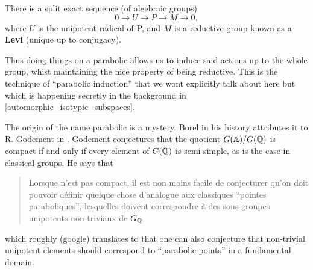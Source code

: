 \begin{Lemma}
    There is a split exact sequence (of algebraic groups)
    \[0 \to U \to P \to M \to 0,\]
    where \(U\) is the unipotent radical of P, and \(M\) is a reductive group known as a \textbf{Levi} (unique up to conjugacy).
\end{Lemma}

Thus doing things on a parabolic allows us to induce said actions up to the whole group, whist maintaining the nice property of being reductive. This is the technique of ``parabolic induction'' \cite[Thm. 10]{bernsteinREPRESENTATIONSPADICGROUPS1992} that we wont explicitly talk about here but which is happening secretly in the background in \ref{automorphic_isotypic_subspaces}.

\begin{Remark}
    The origin of the name parabolic is a mystery. Borel in his history \cite[VI.\S 2]{EssaysHistoryLie} attributes it to R. Godement in \cite{godementGroupesLineairesAlgebriques}. Godement conjectures that the quotient \(G(\A) / G(\Q)\) is compact if and only if every element of \(G(\Q)\) is semi-simple, as is the case in classical groups.  He says that 
    \begin{quote}
        Lorsque n'est pas compact, il est non moins facile de conjecturer qu’on doit pouvoir définir quelque chose d’analogue aux classiques ``pointes paraboliques'', lesquelles doivent correspondre à des  sous-groupes unipotents non triviaux de \(G_\Q\)
    \end{quote}
    which roughly (google) translates to that one can also conjecture that non-trivial unipotent elements should correspond to ``parabolic points'' in a fundamental domain.


\end{Remark}
